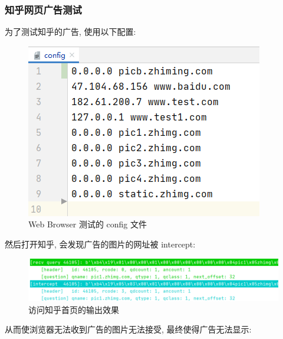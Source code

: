 \documentclass[UTF8]{article}
\begin{document}
\subsubsection{知乎网页广告测试}
\noindent 为了测试知乎的广告, 使用以下配置:
\begin{figure}[H]
	\centering
	\includegraphics[width=\linewidth/2]{browser_config.png}
	\caption{Web Browser 测试的 config 文件}
\end{figure}\par
然后打开知乎, 会发现广告的图片的网址被 intercept:\\
\begin{figure}[H]
	\centering
	\includegraphics[width=\linewidth/9*8]{zhihu_output.png}
	\caption{访问知乎首页的输出效果}
\end{figure}\par
从而使浏览器无法收到广告的图片无法接受, 最终使得广告无法显示:\\
\end{document}
